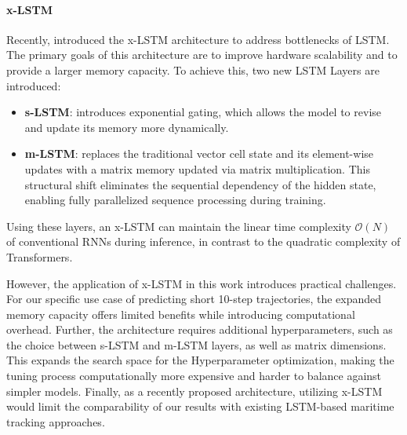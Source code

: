 
    \paragraph{x-LSTM} 

    Recently, \cite{beck2024xlstmextendedlongshortterm} introduced the \ac{x-LSTM} architecture to address bottlenecks of \ac{LSTM}. The primary goals of this architecture are to improve hardware scalability and to provide a larger memory capacity. To achieve this, two new \ac{LSTM} Layers are introduced:
    
    \begin{itemize}
        \item \textbf{\ac{s-LSTM}}: introduces exponential gating, which allows the model to revise and update its memory more dynamically.
        \item \textbf{\ac{m-LSTM}}: replaces the traditional vector cell state and its element-wise updates with a matrix memory updated via matrix multiplication. This structural shift eliminates the sequential dependency of the hidden state, enabling fully parallelized sequence processing during training.
    \end{itemize}
    Using these layers, an \ac{x-LSTM} can maintain the linear time complexity $\mathcal{O}(N)$ of conventional \acp{RNN} during inference, in contrast to the quadratic complexity of Transformers. \cite{beck2024xlstmextendedlongshortterm, attentioniayn} %
    
    However, the application of \ac{x-LSTM} in this work introduces practical challenges. For our specific use case of predicting short 10-step trajectories, the expanded memory capacity offers limited benefits while introducing computational overhead. Further, the architecture requires additional hyperparameters, such as the choice between \ac{s-LSTM} and \ac{m-LSTM} layers, as well as matrix dimensions. %
    This expands the search space for the Hyperparameter optimization, making the tuning process computationally more expensive and harder to balance against simpler models. Finally, as a recently proposed architecture, utilizing \ac{x-LSTM} would limit the comparability of our results with existing \ac{LSTM}-based maritime tracking approaches. 
  
